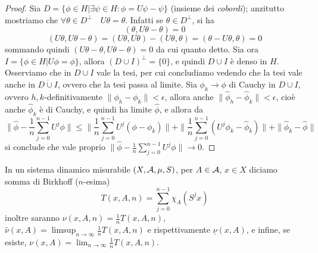 \begin{proof}
 Sia $D=\{\phi\in H|\exists\psi\in H : \phi=U\psi-\psi\}$ (insieme dei \emph{cobordi}); anzitutto mostriamo che $\forall \theta \in D^\bot \quad U\theta=\theta$. Infatti se $\theta \in D^\bot$, si ha
 \[(\theta, U\theta-\theta)=0\]
 \[(U\theta,U\theta-\theta)=(U\theta,U\theta)-(U\theta,\theta)=(\theta-U\theta,\theta)=0\]
 sommando quindi $(U\theta-\theta,U\theta-\theta)=0$ da cui quanto detto.
 Sia ora $I=\{\phi\in H | U\phi=\phi\}$, allora $(D\cup I)^\bot=\{0\}$, e quindi $D\cup I$ è denso in $H$. Osserviamo che in $D\cup I$ vale la tesi, per cui concludiamo vedendo che la tesi vale anche in $\overline{D\cup I}$, ovvero che la tesi passa al limite. Sia $\phi_k\rightarrow\phi$ di Cauchy in $D\cup I$, ovvero $h,k$-definitivamente $\|\phi_h-\phi_k\|<\epsilon$, allora anche $\|\hat\phi_h-\hat\phi_k\|<\epsilon$, cioè anche $\hat\phi_k$ è di Cauchy, e quindi ha limite $\hat\phi$, e allora da
 \[\|\hat\phi-\frac{1}{n}\sum_{j=0}^{n-1}U^j\phi\|\leq \|\frac{1}{n}\sum_{j=0}^{n-1}U^j(\phi-\phi_k)\|+
  \|\frac{1}{n}\sum_{j=0}^{n-1}(U^j\phi_k-\hat\phi_k)\|+\|\hat\phi_k-\hat\phi\|\]
 si conclude che vale proprio $\|\hat\phi-\frac{1}{n}\sum_{j=0}^{n-1}U^j\phi\|\rightarrow 0$.
\end{proof}

\begin{defi}In un sistema dinamico misurabile $(X,\mathcal{A},\mu,S)$, per $A\in\mathcal{A}$, $x\in X$ diciamo somma di Birkhoff ($n$-esima) \[T(x,A,n)=\sum_{j=0}^{n-1}\chi_A(S^jx)\]
inoltre saranno $\nu(x,A,n)=\frac{1}{n}T(x,A,n)$, $\bar\nu(x,A)=\limsup_{n\rightarrow\infty}\frac{1}{n}T(x,A,n)$ e rispettivamente $\underline\nu(x,A)$, e infine, se esiste, $\nu(x,A)=\lim_{n\rightarrow\infty}\frac{1}{n}T(x,A,n)$.
\end{defi}


